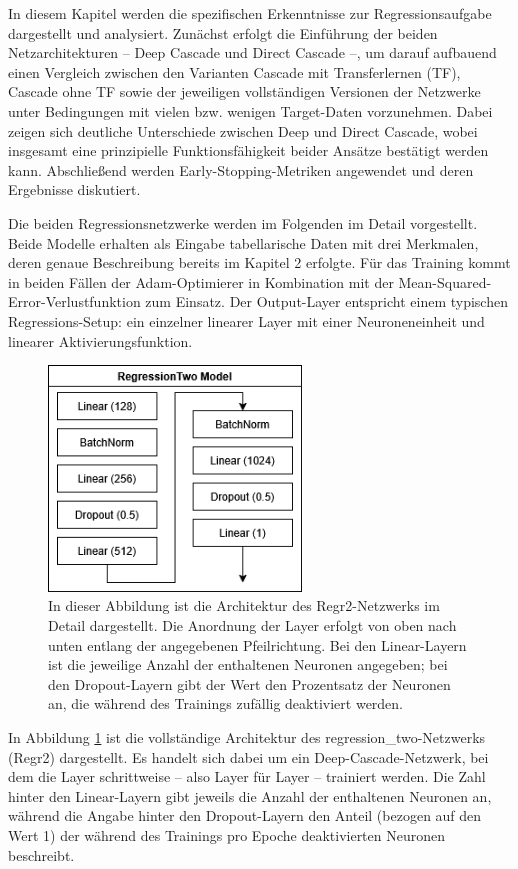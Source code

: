 In diesem Kapitel werden die spezifischen Erkenntnisse zur Regressionsaufgabe dargestellt und analysiert. Zunächst erfolgt die Einführung der 
beiden Netzarchitekturen – Deep Cascade und Direct Cascade –, um darauf aufbauend einen Vergleich zwischen den Varianten Cascade mit 
Transferlernen (TF), Cascade ohne TF sowie der jeweiligen vollständigen Versionen der Netzwerke unter Bedingungen mit vielen bzw. wenigen Target-Daten 
vorzunehmen. Dabei zeigen sich deutliche Unterschiede zwischen Deep und Direct Cascade, wobei insgesamt eine prinzipielle Funktionsfähigkeit 
beider Ansätze bestätigt werden kann. Abschließend werden Early-Stopping-Metriken angewendet und deren Ergebnisse diskutiert.

Die beiden Regressionsnetzwerke werden im Folgenden im Detail vorgestellt. Beide Modelle erhalten als Eingabe tabellarische Daten mit drei 
Merkmalen, deren genaue Beschreibung bereits im Kapitel 2 erfolgte. Für das Training kommt in beiden Fällen der 
Adam-Optimierer in Kombination mit der Mean-Squared-Error-Verlustfunktion zum Einsatz. Der Output-Layer entspricht einem typischen 
Regressions-Setup: ein einzelner linearer Layer mit einer Neuroneneinheit und linearer Aktivierungsfunktion.

\begin{figure}[htpb]
    \centering
    \includegraphics[height=6cm]{../../Graphiken/regressiontwo_2.png}
    \caption{\label{fig:regr2} 
    \small{In dieser Abbildung ist die Architektur des Regr2-Netzwerks im Detail dargestellt. Die Anordnung der Layer erfolgt von oben nach 
    unten entlang der angegebenen Pfeilrichtung. Bei den Linear-Layern ist die jeweilige Anzahl der enthaltenen Neuronen angegeben; bei den 
    Dropout-Layern gibt der Wert den Prozentsatz der Neuronen an, die während des Trainings zufällig deaktiviert werden.}}
\end{figure}

In Abbildung \ref{fig:regr2} ist die vollständige Architektur des regression\_two-Netzwerks (Regr2) dargestellt. Es handelt sich dabei um ein 
Deep-Cascade-Netzwerk, 
bei dem die Layer schrittweise – also Layer für Layer – trainiert werden. Die Zahl hinter den Linear-Layern gibt jeweils die Anzahl der 
enthaltenen Neuronen an, während die Angabe hinter den Dropout-Layern den Anteil (bezogen auf den Wert 1) der während des Trainings pro 
Epoche deaktivierten Neuronen beschreibt.

